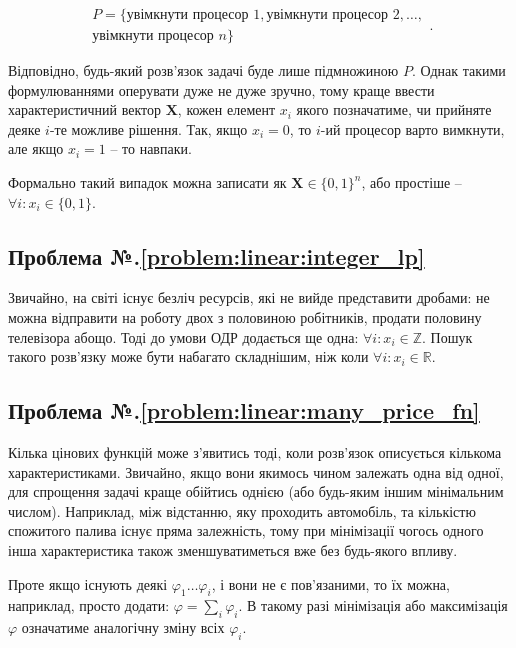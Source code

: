 \documentclass[\main/book.tex]{subfiles}
\begin{document}
\[
\begin{split}
P = \{
 \text{увімкнути процесор 1},
 \text{увімкнути процесор 2},
 \ldots, \\
 \text{увімкнути процесор $n$}
\}
\end{split}
.
\]

Відповідно, будь-який розв'язок задачі буде лише підмножиною $P$. Однак такими формулюваннями оперувати дуже не дуже зручно, тому краще ввести характеристичний вектор $\mathbf{X}$, кожен елемент $x_i$ якого позначатиме, чи прийняте деяке $i$-те можливе рішення. Так, якщо $x_i=0$, то $i$-ий процесор варто вимкнути, але якщо $x_i=1$ -- то навпаки.

\begin{note}
 Формально такий випадок можна записати як $\mathbf{X} \in \{0, 1\}^{n}$, або простіше -- $\forall i: x_i \in \{0, 1\}$.
\end{note}

\clearpage
{}

\subsection*{Проблема №.\ref{problem:linear:integer_lp}}

Звичайно, на світі існує безліч ресурсів, які не вийде представити дробами: не можна відправити на роботу двох з половиною робітників, продати половину телевізора абощо. Тоді до умови ОДР додається ще одна: $\forall i: x_i \in \mathbb{Z}$. Пошук такого розв'язку може бути набагато складнішим, ніж коли $\forall i: x_i \in \mathbb{R}$.

\subsection*{Проблема №.\ref{problem:linear:many_price_fn}}

Кілька цінових функцій може з'явитись тоді, коли розв'язок описується кількома характеристиками. Звичайно, якщо вони якимось чином залежать одна від одної, для спрощення задачі краще обійтись однією (або будь-яким іншим мінімальним числом). Наприклад, між відстанню, яку проходить автомобіль, та кількістю спожитого палива існує пряма залежність, тому при мінімізації чогось одного інша характеристика також зменшуватиметься вже без будь-якого впливу.

Проте якщо існують деякі $\varphi_1 \ldots \varphi_i$, і вони не є пов'язаними, то їх можна, наприклад, просто додати: $\varphi = \sum_i \varphi_i$. В такому разі мінімізація або максимізація $\varphi$ означатиме аналогічну зміну всіх $\varphi_i$.
\end{document}
